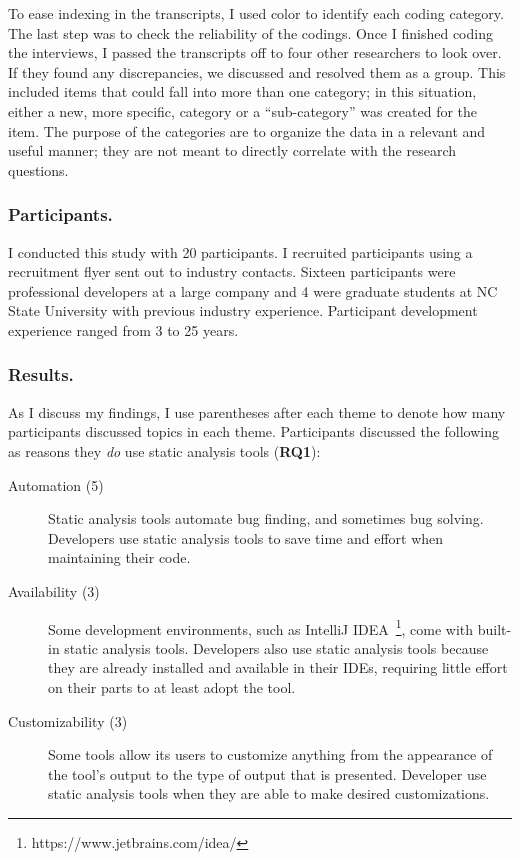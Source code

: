 \documentclass{llncs}
\begin{document}
To ease indexing in the transcripts, I used color to identify each coding category.
The last step was to check the reliability of the codings. Once I finished coding the interviews, I passed the transcripts off to four other researchers to look over. If they found any discrepancies, we discussed and resolved them as a group. This included items that could fall into more than one category; in this situation, either a new, more specific, category or a ``sub-category'' was created for the item. The purpose of the categories are to organize the data in a relevant and useful manner; they are not meant to directly correlate with the research questions.

\subsubsection{Participants.} I conducted this study with 20 participants. I recruited participants using a recruitment flyer sent out to industry contacts. Sixteen participants were professional developers at a large company and 4 were graduate students at NC State University with previous industry experience. Participant development experience ranged from 3 to 25 years.

\subsubsection{Results.} As I discuss my findings, I use parentheses after each theme to denote how many participants discussed topics in each theme. 
Participants discussed the following as reasons they \emph{do} use static analysis tools (\textbf{RQ1}): 
\begin{description}
	\item[Automation (5)] Static analysis tools automate bug finding, and sometimes bug solving. Developers use static analysis tools to save time and effort when maintaining their code.
	\item[Availability (3)] Some development environments, such as IntelliJ IDEA~\footnote{https://www.jetbrains.com/idea/}, come with built-in static analysis tools. Developers also use static analysis tools because they are already installed and available in their IDEs, requiring little effort on their parts to at least adopt the tool.
	\item[Customizability (3)] Some tools allow its users to customize anything from the appearance of the tool's output to the type of output that is presented. Developer use static analysis tools when they are able to make desired customizations.
\end{description}
\end{document}

